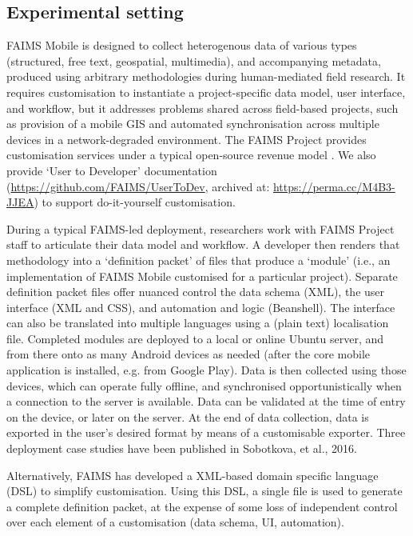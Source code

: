 \documentclass[preprint,12pt, a4paper]{elsarticle}
\begin{document}
\subsection{Experimental setting}


FAIMS Mobile is designed to collect heterogenous data of various types (structured, free text, geospatial, multimedia), and accompanying metadata, produced using arbitrary methodologies during human-mediated field research. It requires customisation to instantiate a project-specific data model, user interface, and workflow, but it addresses problems shared across field-based projects, such as provision of a mobile GIS and automated synchronisation across multiple devices in a network-degraded environment. The FAIMS Project provides customisation services under a typical open-source revenue model \cite{Kelly2008-sb}. We also provide `User to Developer' documentation (\url{https://github.com/FAIMS/UserToDev}, archived at: \url{https://perma.cc/M4B3-JJEA}) to support do-it-yourself customisation.

During a typical FAIMS-led deployment, researchers work with FAIMS Project staff to articulate their data model and workflow. A developer then renders that methodology into a `definition packet' of files that produce a `module' (i.e., an implementation of FAIMS Mobile customised for a particular project). Separate definition packet files offer nuanced control the data schema (XML), the user interface (XML and CSS), and automation and logic (Beanshell). The interface can also be translated into multiple languages using a (plain text) localisation file. Completed modules are deployed to a local or online Ubuntu server, and from there onto as many Android devices as needed (after the core mobile application is installed, e.g. from Google Play). Data is then collected using those devices, which can operate fully offline, and synchronised opportunistically when a connection to the server is available. Data can be validated at the time of entry on the device, or later on the server. At the end of data collection, data is exported in the user's desired format by means of a customisable exporter. Three deployment case studies have been published in Sobotkova, et al., 2016\cite{Sobotkova2016-mx}.

Alternatively, FAIMS has developed a XML-based domain specific language (DSL) to simplify customisation. Using this DSL, a single file is used to generate a complete definition packet, at the expense of some loss of independent control over each element of a customisation (data schema, UI, automation). 
\end{document}
